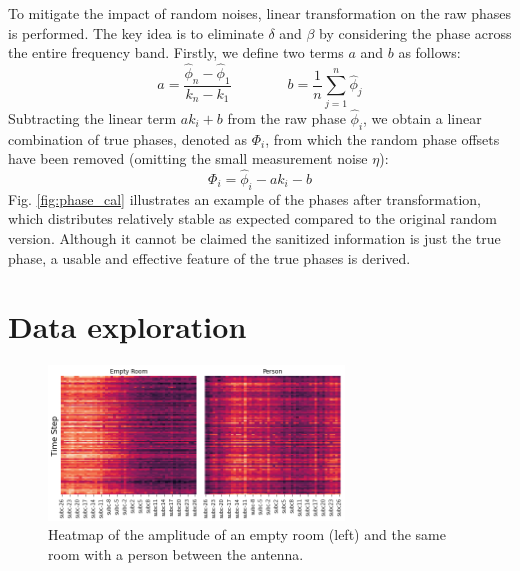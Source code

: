 \documentclass[binding=0.7cm, oneside]{sapthesis}
\begin{document}
To mitigate the impact of random noises, linear transformation on the raw phases is performed. The key idea is to eliminate $\delta$ and $\beta$ by considering the phase across the entire frequency band. Firstly, we define two terms
$a$ and $b$ as follows:
$$ a = \frac{\hat{\phi}_n - \hat{\phi}_1}{k_n - k_1} \qquad \qquad b = \frac{1}{n}\sum_{j=1}^{n}\hat{\phi}_j$$
Subtracting the linear term $ak_i + b$ from the raw phase $\hat{\phi}_i$, we obtain a linear combination of true phases, denoted as $\Phi_i$, from which the random phase offsets have been removed (omitting the small measurement noise $\eta$):
$$\Phi_i = \hat{\phi}_i - ak_i - b $$
Fig. \ref{fig:phase_cal} illustrates an example of the phases after transformation, which distributes relatively stable as expected compared to the original random version. Although it cannot be claimed
the sanitized information is just the true phase, a usable and effective feature of the true phases is derived.
\section{Data exploration}
\begin{figure}[h]
    \centering
    \includegraphics[width=0.70\textwidth]{images/empy_person_heatmap.png}
    \caption{Heatmap of the amplitude of an empty room (left) and the same room with a person between the antenna.}
    \label{fig:heatmap}
\end{figure}


\end{document}
